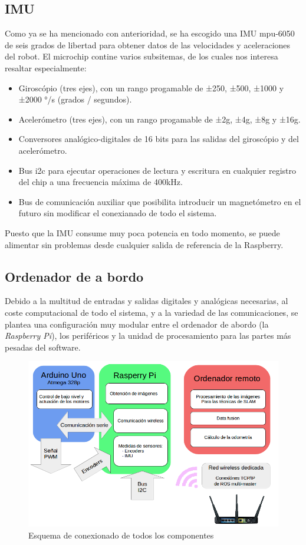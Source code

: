\subsection{IMU}\label{imu_hardw}
Como ya se ha mencionado con anterioridad, se ha escogido una IMU mpu-6050 de seis grados de libertad para obtener datos de las velocidades y aceleraciones del robot. El microchip contine varios subsitemas, de los cuales nos interesa resaltar especialmente:
\begin{itemize}
	\item Giroscópio (tres ejes), con un rango progamable de ±250, ±500, ±1000 y ±2000 °/s (grados / segundos).
	\item Acelerómetro (tres ejes), con un rango progamable de ±2g, ±4g, ±8g y ±16g.
	\item Conversores analógico-digitales de 16 bits para las salidas del giroscópio y del acelerómetro.
	\item Bus i2c para ejecutar operaciones de lectura y escritura en cualquier registro del chip a una frecuencia máxima de 400kHz.
	\item Bus de comunicación auxiliar que posibilita introducir un magnetómetro en el futuro sin modificar el conexianado de todo el sistema.
\end{itemize}
Puesto que la IMU consume muy poca potencia en todo momento, se puede alimentar sin problemas desde cualquier salida de referencia de la Raspberry. 

\subsection{Ordenador de a bordo}
Debido a la multitud de entradas y salidas digitales y analógicas necesarias, al coste computacional de todo el sistema, y a la variedad de las comunicaciones, se plantea una configuración muy modular entre el ordenador de abordo (la \textit{Raspberry Pi}), los periféricos y la unidad de procesamiento para las partes más pesadas del software.\\
  \begin{figure}[h!]
  	\centering
  	\includegraphics[width=.7\textwidth]{images/hw/wheele_esquema}
  	\caption{Esquema de conexionado de todos los componentes}
  \end{figure}\\
